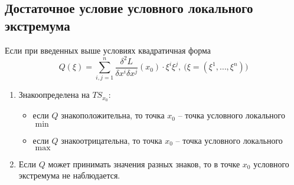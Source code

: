 \setcounter{subsection}{27}

\subsection{Достаточное условие условного локального экстремума}

\begin{theorem}
    Если при введенных выше условиях квадратичная форма
    \[
        Q(\xi) = \sum_{i,j=1}^{n}\frac{\delta^2 L}{\delta x^i \delta x^j}(x_0)\cdot\xi^i\xi^j,\ \big(\xi=(\xi^1,\ldots,\xi^n)\big)
    \]
    \begin{enumerate}
        \item Знакоопределена на $TS_{x_0}$:
              \begin{itemize}
                  \item если $Q$ знакоположительна, то точка $x_0$ -- точка условного локального $\min$
                  \item если $Q$ знакоотрицательна, то точка $x_0$ -- точка условного локального $\max$
              \end{itemize}
        \item Если $Q$ может принимать значения разных знаков, то в точке $x_0$ условного экстремума не наблюдается.
    \end{enumerate}
\end{theorem}

